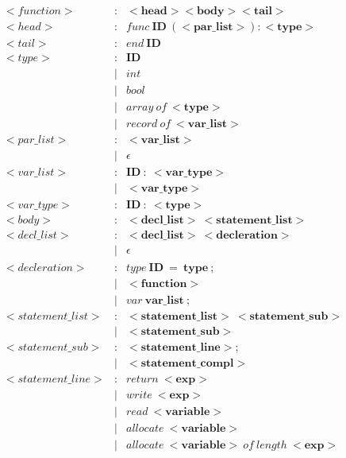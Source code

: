 \documentclass{article}
\begin{document}
\begin{align*}
    <function> 	&:	&<\boldsymbol{head}><\boldsymbol{body}><\boldsymbol{tail}> \\
    <head>&: &func\ \boldsymbol{ID}\ (<\boldsymbol{par\_list}>):<\boldsymbol{type}> \\
    <tail> &: & end\ \boldsymbol{ID} \\
    <type>&: &\boldsymbol{ID} \\
    & |& int \\
    & |& bool\\
    & |& array\ of\ <\boldsymbol{type}>\\
    & |& record\ of\ <\boldsymbol{var\_list}> \\
    <par\_list> &: & <\boldsymbol{var\_list}> \\
    &| & \epsilon \\
    <var\_list> & : & \boldsymbol{ID}\ :\ <\boldsymbol{var\_type}> \\
    & |& <\boldsymbol{var\_type}> \\ 
    <var\_type> & : & \boldsymbol{ID}\ :\ <\boldsymbol{type}> \\
    <body> & : & <\boldsymbol{decl\_list}> \ <\boldsymbol{statement\_list}> \\
    <decl\_list> & : & <\boldsymbol{decl\_list}>\ <\boldsymbol{decleration}> \\
    & | & \epsilon \\ 
    <decleration> & : & type\ \boldsymbol{ID}\ = \ \boldsymbol{type}\ ; \\
    & | & <\boldsymbol{function}> \\
    & | & var\ \boldsymbol{var\_list}\ ; \\
    <statement\_list> & : & <\boldsymbol{statement\_list}>\ <\boldsymbol{statement\_sub}> \\
    & | & <\boldsymbol{statement\_sub}> \\
    <statement\_sub> & : & <\boldsymbol{statement\_line}> ; \\
    & | & <\boldsymbol{statement\_compl}> \\
    <statement\_line> & : & return\ <\boldsymbol{exp}>\ \\
    & | & write\ <\boldsymbol{exp}>\  \\
    & | & read\ <\boldsymbol{variable}> \\
    & | & allocate\ <\boldsymbol{variable}>\ \\
    & | & allocate\ <\boldsymbol{variable}>\ of\ length\ <\boldsymbol{exp}>\ \\

\end{align*}
\end{document}
